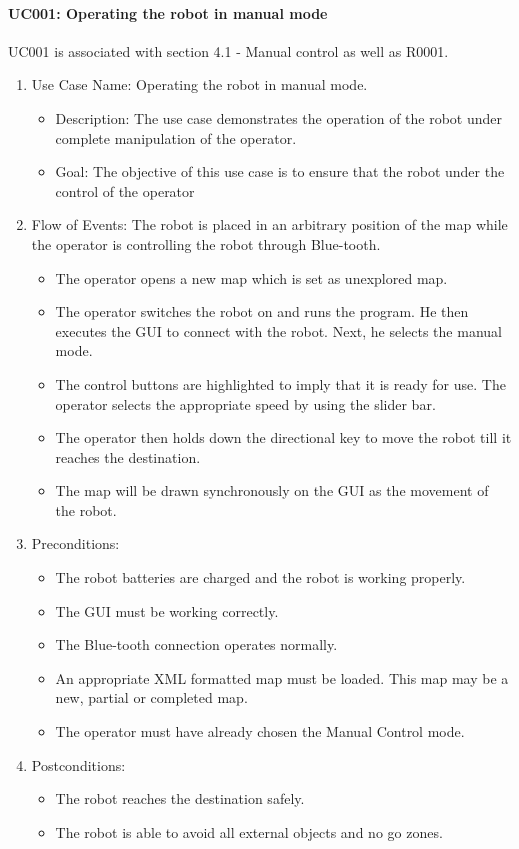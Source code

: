 \documentclass[11pt, a4paper]{report}
\begin{document}
\paragraph{UC001: Operating the robot in manual mode}
UC001 is associated with section 4.1 - Manual control as well as R0001.
\begin{enumerate}
	\item Use Case Name: Operating the robot in manual mode.
	\begin{itemize}	
		\item Description: The use case demonstrates the operation of the robot under complete manipulation of the operator.
		\item Goal: The objective of this use case is to ensure that the robot under the control of the operator
	\end{itemize}
	\item Flow of Events: The robot is placed in an arbitrary position of the map while
	the operator is controlling the robot through Blue-tooth.
	\begin{itemize}
		\item The operator opens a new map which is set as unexplored map.  
		\item The operator switches the robot on and runs the program. He then executes the GUI to connect with the robot. Next, he selects the manual mode.
		\item The control buttons are highlighted to imply that it is ready for use. The operator selects the appropriate speed by using the slider bar.
		\item The operator then holds down the directional key to move the robot till it reaches the destination.	
		\item The map will be drawn synchronously on the GUI as the movement of the robot.   	
	\end{itemize}
	\item Preconditions:
	\begin{itemize}
		\item	The robot batteries are charged and the robot is working properly.
		\item	The GUI must be working correctly.
		\item	The Blue-tooth connection operates normally.
		\item	An appropriate XML formatted map must be loaded. This map may be a new, partial or completed map.
		\item The operator must have already chosen the Manual Control mode. 
	\end{itemize}
	\item	Postconditions:
	\begin{itemize}
		\item The robot reaches the destination safely.
		\item The robot is able to avoid all external objects and no go zones.
	\end{itemize}
\end{enumerate}
\end{document}
